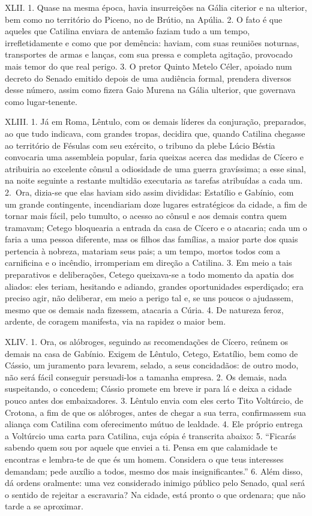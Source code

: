 XLII. 1. Quase na mesma época, havia insurreições na Gália citerior e na
ulterior, bem como no território do Piceno, no de Brútio, na Apúlia. 2. O fato
é que aqueles que Catilina enviara de antemão faziam tudo a um tempo,
irrefletidamente e como que por demência: haviam, com suas reuniões noturnas,
transportes de armas e lanças, com sua pressa e completa agitação, provocado
mais temor do que real perigo. 3. O pretor Quinto Metelo Céler, apoiado num
decreto do Senado emitido depois de uma audiência formal, prendera diversos
desse número, assim como fizera Gaio Murena na Gália ulterior, que governava como
lugar-tenente.

XLIII. 1. Já em Roma, Lêntulo, com os demais líderes da conjuração, preparados,
ao que tudo indicava, com grandes tropas, decidira que, quando Catilina
chegasse ao território de Fésulas com seu exército, o tribuno da plebe Lúcio
Béstia convocaria uma assembleia popular, faria queixas acerca das medidas de
Cícero e atribuiria ao excelente cônsul a odiosidade de uma guerra gravíssima;
a esse sinal, na noite seguinte a restante multidão executaria as tarefas
atribuídas a cada um. 2.~Ora, dizia-se que elas haviam sido assim divididas:
Estatílio e Gabínio, com um grande contingente, incendiariam doze lugares
estratégicos da cidade, a fim de tornar mais fácil, pelo tumulto, o acesso ao
cônsul e aos demais contra quem tramavam; Cetego bloquearia a entrada da casa
de Cícero e o atacaria; cada um o faria a uma pessoa diferente, mas os filhos
das famílias, a maior parte dos quais pertencia à nobreza, matariam seus pais;
a um tempo, mortos todos com a carnificina e o incêndio, irromperiam em direção
a Catilina. 3. Em meio a tais preparativos e deliberações, Cetego queixava-se a
todo momento da apatia dos aliados: eles teriam, hesitando e adiando, grandes
oportunidades esperdiçado; era preciso agir, não deliberar, em meio a perigo
tal e, se uns poucos o ajudassem, mesmo que os demais nada fizessem, atacaria a
Cúria. 4. De natureza feroz, ardente, de coragem manifesta, via na rapidez o
maior bem.

XLIV. 1. Ora, os alóbroges, seguindo as recomendações de Cícero, reúnem os
demais na casa de Gabínio. Exigem de Lêntulo, Cetego, Estatílio, bem como de
Cássio, um juramento para levarem, selado, a seus concidadãos: de outro modo,
não será fácil conseguir persuadi-los a tamanha empresa. 2. Os demais, nada
suspeitando, o concedem; Cássio promete em breve ir para lá e deixa a cidade
pouco antes dos embaixadores. 3. Lêntulo envia com eles certo Tito Voltúrcio,
de Crotona, a fim de que os alóbroges, antes de chegar a sua terra,
confirmassem sua aliança com Catilina com oferecimento mútuo de lealdade. 4.
Ele próprio entrega a Voltúrcio uma carta para Catilina, cuja cópia é
transcrita abaixo: 5. “Ficarás sabendo quem sou por aquele que enviei a ti.
Pensa em que calamidade te encontras e lembra-te de que és um homem. Considera
o que teus interesses demandam; pede auxílio a todos, mesmo dos mais
insignificantes.” 6. Além disso, dá ordens oralmente: uma vez considerado
inimigo público pelo Senado, qual será o sentido de rejeitar a escravaria? Na
cidade, está pronto o que ordenara; que não tarde a se aproximar.

